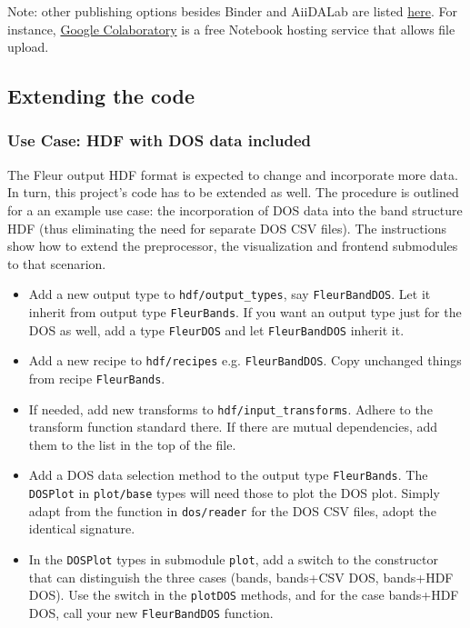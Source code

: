 Note: other publishing options besides Binder and AiiDALab are listed
\href{https://github.com/markusschanta/awesome-jupyter}{here}. For
instance, \href{http://colab.research.google.com/}{Google Colaboratory}
is a free Notebook hosting service that allows file upload.

\subsection{Extending the code}\label{extending-the-code}

\subsubsection{Use Case: HDF with DOS data
  included}\label{use-case-hdf-with-dos-data-included}

The Fleur output HDF format is expected to change and incorporate more
data. In turn, this project's code has to be extended as well. The
procedure is outlined for a an example use case: the incorporation of
DOS data into the band structure HDF (thus eliminating the need for
separate DOS CSV files). The instructions show how to extend the
preprocessor, the visualization and frontend submodules to that
scenarion.

\begin{itemize}
    \tightlist
\item
    Add a new output type to \texttt{hdf/output\_types}, say
    \texttt{FleurBandDOS}. Let it inherit from output type
    \texttt{FleurBands}. If you want an output type just for the DOS as
    well, add a type \texttt{FleurDOS} and let \texttt{FleurBandDOS}
    inherit it.
\item
    Add a new recipe to \texttt{hdf/recipes} e.g. \texttt{FleurBandDOS}.
    Copy unchanged things from recipe \texttt{FleurBands}.
\item
    If needed, add new transforms to \texttt{hdf/input\_transforms}.
    Adhere to the transform function standard there. If there are mutual
    dependencies, add them to the list in the top of the file.
\item
    Add a DOS data selection method to the output type
    \texttt{FleurBands}. The \texttt{DOSPlot} in \texttt{plot/base} types
    will need those to plot the DOS plot. Simply adapt from the function
    in \texttt{dos/reader} for the DOS CSV files, adopt the identical
    signature.
\item
    In the \texttt{DOSPlot} types in submodule \texttt{plot}, add a switch
    to the constructor that can distinguish the three cases (bands,
    bands+CSV DOS, bands+HDF DOS). Use the switch in the \texttt{plotDOS}
    methods, and for the case bands+HDF DOS, call your new
    \texttt{FleurBandDOS} function.
\end{itemize}

